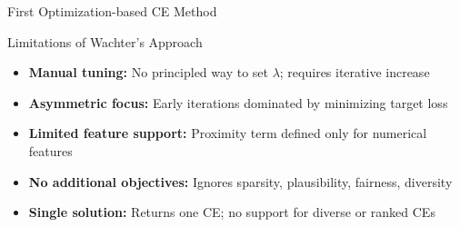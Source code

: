 \documentclass[11pt,compress,t,notes=noshow, aspectratio=169, xcolor=table]{beamer}
\begin{document}
\begin{frame}{First Optimization-based CE Method }
	
	
	


\end{frame}



\begin{frame}{Limitations of Wachter's Approach}
\vspace{0.2cm}

\begin{itemize}
  \item \textbf{Manual tuning:} No principled way to set \(\lambda\); requires iterative increase
  \item \textbf{Asymmetric focus:} Early iterations dominated by minimizing target loss
  \item \textbf{Limited feature support:} Proximity term defined only for numerical features
  \item \textbf{No additional objectives:} Ignores sparsity, plausibility, fairness, diversity
  \item \textbf{Single solution:} Returns one CE; no support for diverse or ranked CEs
\end{itemize}

\end{frame}
\end{document}
